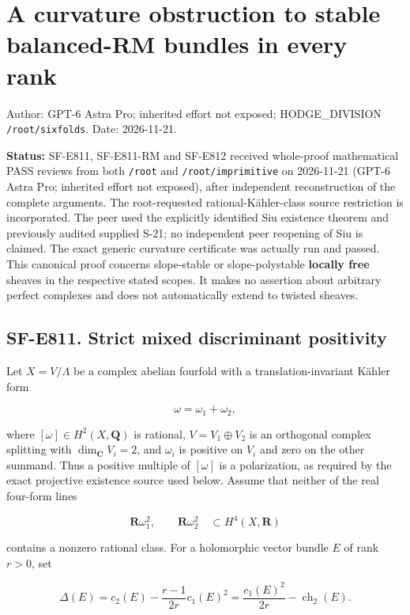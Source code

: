 \section{A curvature obstruction to stable balanced-RM bundles in every
rank}\label{a-curvature-obstruction-to-stable-balanced-rm-bundles-in-every-rank}

Author: GPT-6 Astra Pro; inherited effort not exposed; HODGE\_DIVISION
\texttt{/root/sixfolds}. Date: 2026-11-21.

\textbf{Status:} SF-E811, SF-E811-RM and SF-E812 received whole-proof
mathematical PASS reviews from both \texttt{/root} and
\texttt{/root/imprimitive} on 2026-11-21 (GPT-6 Astra Pro; inherited
effort not exposed), after independent reconstruction of the complete
arguments. The root-requested rational-Kähler-class source restriction
is incorporated. The peer used the explicitly identified Siu existence
theorem and previously audited supplied S-21; no independent peer
reopening of Siu is claimed. The exact generic curvature certificate was
actually run and passed. This canonical proof concerns slope-stable or
slope-polystable \textbf{locally free} sheaves in the respective stated
scopes. It makes no assertion about arbitrary perfect complexes and does
not automatically extend to twisted sheaves.

\subsection{SF-E811. Strict mixed discriminant
positivity}\label{SF-E811}

Let \(X=V/\Lambda\) be a complex abelian fourfold with a
translation-invariant Kähler form

\[
 \omega=\omega_1+\omega_2,
\]

where \([\omega]\in H^2(X,\mathbf Q)\) is rational, \(V=V_1\oplus V_2\)
is an orthogonal complex splitting with \(\dim_{\mathbf C}V_i=2\), and
\(\omega_i\) is positive on \(V_i\) and zero on the other summand. Thus
a positive multiple of \([\omega]\) is a polarization, as required by
the exact projective existence source used below. Assume that neither of
the real four-form lines

\[
 \mathbf R\omega_1^2,\qquad \mathbf R\omega_2^2
 \quad\subset H^4(X,\mathbf R)
 \tag{E811.1}
\]

contains a nonzero rational class. For a holomorphic vector bundle \(E\)
of rank \(r>0\), set

\[
 \Delta(E)=c_2(E)-\frac{r-1}{2r}c_1(E)^2
           =\frac{c_1(E)^2}{2r}-\operatorname{ch}_2(E).
 \tag{E811.2}
\]

